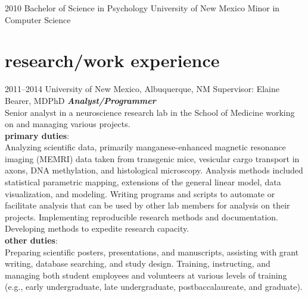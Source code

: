 \documentclass[]{friggeri-cv} %
\begin{document}
\begin{entrylist}
\entry
{2010}
{Bachelor of Science {\normalfont in Psychology}}
{University of New Mexico}
{Minor in Computer Science}
\end{entrylist}

\section{research/work experience}

\begin{entrylist}
\entry
{\footnotesize{2011--2014}}
{University of New Mexico, Albuquerque, NM \textemdash Supervisor: Elaine Bearer, MD\textendash PhD}
{}
{\emph{\textbf{Analyst/Programmer}} \\
Senior analyst in a neuroscience research lab in the School of Medicine 
working on and managing various projects. \\
\textbf{primary duties}: \\
Analyzing scientific data, primarily manganese-enhanced magnetic resonance imaging (MEMRI) data 
taken from transgenic mice,
vesicular cargo transport in axons, 
DNA methylation, and histological microscopy. Analysis methods included
statistical parametric mapping, 
extensions of the general linear model, 
data visualization, and modeling.
Writing programs and scripts to automate or facilitate analysis 
that can be used by other lab members for analysis on their projects. 
Implementing reproducible research methods and documentation. 
Developing methods to expedite research capacity. \\
\textbf{other duties}: \\
Preparing scientific posters, presentations, and manuscripts, 
assisting with grant writing, database searching, and study design. 
Training, instructing, and managing both student employees and volunteers at various levels of training 
(e.g., early undergraduate, late undergraduate, postbaccalaureate, and graduate). }
\end{entrylist}
\end{document}
